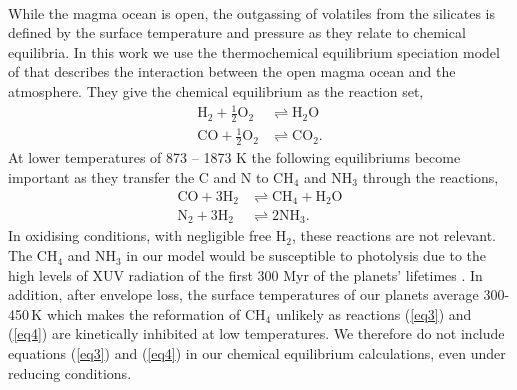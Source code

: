 \documentclass[bibyear,tradiabstract]{aa}
\begin{document}
\\
{While the magma ocean is open, the outgassing of volatiles from the silicates is defined by the surface temperature and pressure as they relate to chemical equilibria.} In this work we use the thermochemical equilibrium speciation model of \cite{Ortenzi+2020} that describes the interaction between the open magma ocean and the atmosphere. They give the chemical equilibrium as the reaction set,
\begin{align}
    \mathrm{H}_2 + \frac{1}{2}\mathrm{O}_2 &\rightleftharpoons \mathrm{H}_2\mathrm{O} \label{eq1}\\
    \mathrm{CO} + \frac{1}{2}\mathrm{O}_2 &\rightleftharpoons \mathrm{CO}_2. \label{eq2}   
\end{align}
At lower temperatures of 873 -- 1873 K \citep{Tian&Heng2023} the following equilibriums become important as they transfer the C and N to CH$_4$ and NH$_3$ through the reactions,
\begin{align}
    \mathrm{CO} + 3 \mathrm{H}_2 &\rightleftharpoons \mathrm{CH}_4 + \mathrm{H}_2\mathrm{O} \label{eq3}\\
    \mathrm{N}_2 + 3\mathrm{H}_2 &\rightleftharpoons 2\mathrm{NH}_3. \label{eq4}
\end{align}
In oxidising conditions, with negligible free H$_2$, these reactions are not relevant. The CH$_4$ and NH$_3$ in our model would be susceptible to photolysis due to the high levels of XUV radiation of the first 300 Myr of the planets' lifetimes \citep{Kasting1982,Romanzin+2005,Kasting2014}. In addition, after envelope loss, the surface temperatures of our planets average 300-450\,K which makes the reformation of CH$_4$ unlikely as reactions (\ref{eq3}) and (\ref{eq4}) are kinetically inhibited at low temperatures. We therefore do not include equations (\ref{eq3}) and (\ref{eq4}) in our chemical equilibrium calculations, even under reducing conditions.
\end{document}

